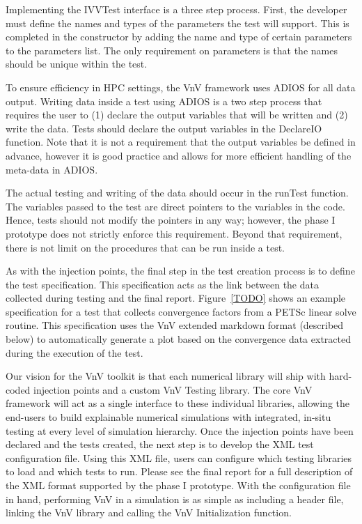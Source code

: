 Implementing the IVVTest interface is a three step process. First, the developer must define the names and types of the parameters the test will support. This is completed in the constructor by adding the name and type of certain parameters to the parameters list. The only requirement on parameters is that the names should be unique within the test. 

To ensure efficiency in HPC settings, the VnV framework uses ADIOS for all data output. Writing data inside a test using ADIOS is a two step process that requires the user to (1) declare the output variables that will be written and (2) write the data. Tests should declare the output variables in the DeclareIO function. Note that it is not a requirement that the output variables be defined in advance, however it is good practice and allows for more efficient handling of the meta-data in ADIOS. 

The actual testing and writing of the data should occur in the runTest function. The variables passed to the test are direct pointers to the variables in the code. Hence, tests should not modify the pointers in any way; however, the phase I prototype does not strictly enforce this requirement. Beyond that requirement, there is not limit on the procedures that can be run inside a test. 

As with the injection points, the final step in the test creation process is to define the test specification. This specification acts as the link between the data collected during testing and the final report. Figure~\ref{TODO} shows an example specification 
for a test that collects convergence factors from a PETSc linear solve routine. This specification uses the VnV extended markdown format (described below) to automatically generate a plot based on the convergence data extracted during the execution of the test.

Our vision for the VnV toolkit is that each numerical library will ship with hard-coded injection points and a custom VnV Testing library. The core VnV framework will act as a single interface to these individual libraries, allowing the end-users to build explainable numerical simulations with integrated, in-situ testing at every level of simulation hierarchy. Once the injection points have been declared and the tests created, the next step is to develop the XML test configuration file. Using this XML file, users can configure which testing libraries to load and which tests to run. Please see the final report for a full description of the XML format supported by the phase I prototype. With the configuration file in hand, performing VnV in a simulation is as simple as including a header file, linking the VnV library and calling the VnV Initialization function. 

